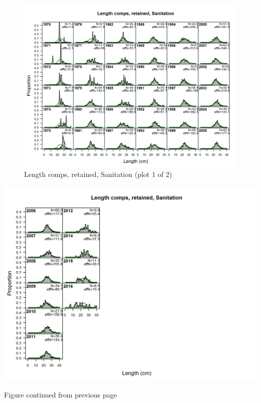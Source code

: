 \documentclass[12pt,]{article}
\begin{document}
\begin{figure}[htbp]
\centering
\includegraphics{./r4ss/plots_mod1/comp_lenfit_flt7mkt2_page1.png}
\caption{Length comps, retained, Sanitation (plot 1 of 2)
\label{fig:mod1_8_comp_lenfit_flt7mkt2_page1}}
\end{figure}

\includegraphics{./r4ss/plots_mod1/comp_lenfit_flt7mkt2_page2.png}

\begin{center} 

              Figure continued from previous page 

             \end{center}
\end{document}
